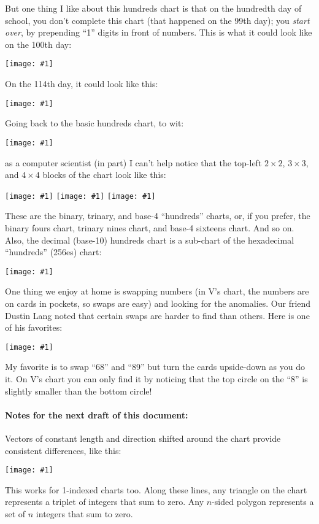 \documentclass[12pt,pdftex]{article}
\newcommand{\showchart}[1]{\texttt{[image: \#1]}}
\begin{document}
But one thing I like about this hundreds chart is that on the
hundredth day of school, you don't complete this chart (that happened
on the 99th day); you \emph{start over}, by prepending ``1'' digits in
front of numbers.  This is what it could look like on the 100th day:
\begin{center}
\showchart{hundreds_chart_day100.pdf}
\end{center}
On the 114th day, it could look like this:
\begin{center}
\showchart{hundreds_chart_day114.pdf}
\end{center}

Going back to the basic hundreds chart, to wit:
\begin{center}
\showchart{hundreds_chart_default.pdf}
\end{center}
as a computer scientist (in part) I can't help notice that the
top-left $2\times 2$, $3\times 3$, and $4\times 4$ blocks of the
chart look like this:
\begin{center}
\showchart{hundreds_chart_2x2_base2.pdf}
\quad
\showchart{hundreds_chart_3x3_base3.pdf}
\quad
\showchart{hundreds_chart_4x4_base4.pdf}
\end{center}
These are the binary, trinary, and base-4 ``hundreds'' charts, or, if
you prefer, the binary fours chart, trinary nines chart, and base-4
sixteens chart.  And so on.  Also, the decimal (base-10) hundreds
chart is a sub-chart of the hexadecimal ``hundreds'' (256es) chart:
\begin{center}
\showchart{hundreds_chart_16x16_base16.pdf}
\end{center}

One thing we enjoy at home is swapping numbers (in V's chart, the
numbers are on cards in pockets, so swaps are easy) and looking for
the anomalies.  Our friend Dustin Lang noted that certain swaps are
harder to find than others.  Here is one of his favorites:
\begin{center}
\showchart{hundreds_chart_swap14.pdf}
\end{center}
My favorite is to swap ``68'' and ``89'' but turn the cards
upside-down as you do it.  On V's chart you can only find it by
noticing that the top circle on the ``8'' is slightly smaller than the
bottom circle!

\paragraph{Notes for the next draft of this document:}
Vectors of constant length and direction shifted around the chart
provide consistent differences, like this:
\begin{center}
\showchart{hundreds_chart_tr_23.pdf}
\end{center}
This works for 1-indexed charts too.  Along these lines, any triangle
on the chart represents a triplet of integers that sum to zero.  Any
$n$-sided polygon represents a set of $n$ integers that sum to zero.
\end{document}
